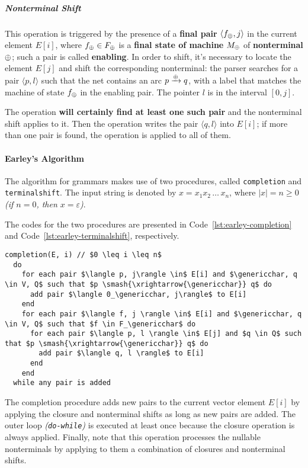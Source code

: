 \documentclass[english]{article}
\begin{document}
\subparagraph*{Nonterminal Shift}
This operation is triggered by the presence of a \textbf{final pair} \(\langle f_\oplus, j \rangle\) in the current element \(E[i]\), where \(f_\oplus \in F_\oplus\) is a \textbf{final state of machine }\(M_\oplus\) of \textbf{nonterminal} \(\oplus\);
such a pair is called \textbf{enabling}.
In order to shift, it's necessary to locate the element \(E[j]\) and shift the corresponding nonterminal:
the parser searches for a pair \(\langle p, l \rangle\) such that the net contains an arc \(p \xrightarrow{\oplus} q\), with a label that matches the machine of state \(f_\oplus\) in the enabling pair.
The pointer \(l\) is in the interval \(\left[ 0, j \right]\).

The operation \textbf{will certainly find at least one such pair} and the nonterminal shift applies to it.
Then the operation writes the pair \(\langle q, l\rangle\) into \(E[i]\); if more than one pair is found, the operation is applied to all of them.

\paragraph{Earley's Algorithm}

The algorithm for \EBNF grammars makes use of two procedures, called \texttt{completion} and \texttt{terminalshift}.
The input string is denoted by \(x = x_1 x_2 \,\ldots\, x_n\), where \(|x| = n \geq 0\) \textit{(if \(n = 0\), then \(x = \varepsilon\))}.

The codes for the two procedures are presented in Code~\ref{lst:earley-completion} and Code~\ref{lst:earley-terminalshift}, respectively.

\begin{lstlisting}[caption={\texttt{completion} procedure}, label={lst:earley-completion}]
completion(E, i) // $0 \leq i \leq n$
  do
    for each pair $\langle p, j\rangle \in$ E[i] and $\genericchar, q \in V, Q$ such that $p \smash{\xrightarrow{\genericchar}} q$ do
      add pair $\langle 0_\genericchar, j\rangle$ to E[i]
    end
    for each pair $\langle f, j \rangle \in$ E[i] and $\genericchar, q \in V, Q$ such that $f \in F_\genericchar$ do
      for each pair $\langle p, l \rangle \in$ E[j] and $q \in Q$ such that $p \smash{\xrightarrow{\genericchar}} q$ do
        add pair $\langle q, l \rangle$ to E[i]
      end
    end
  while any pair is added
\end{lstlisting}

The completion procedure adds new pairs to the current vector element \(E[i]\) by applying the closure and nonterminal shifts as long as new pairs are added.
The outer loop \textit{(\texttt{do-while})} is executed at least once because the closure operation is always applied.
Finally, note that this operation processes the nullable nonterminals by applying to them a combination of closures and nonterminal shifts.
\end{document}
